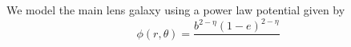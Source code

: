 We model the main lens galaxy using a power law potential given by
\begin{equation}
\phi(r, \theta) = \frac{b^{2 - \eta} (1 - e)^ {2 - \eta}}{}
\end{equation}